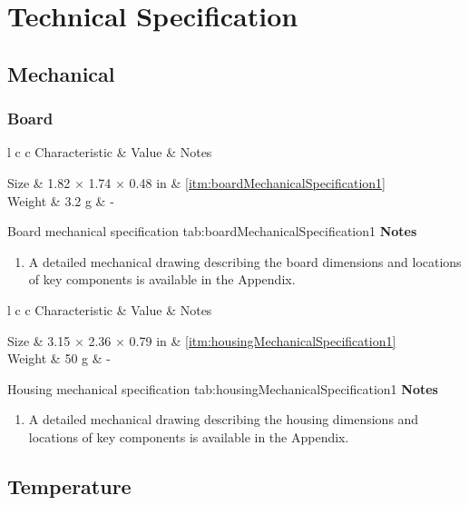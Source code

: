 \section{Technical Specification}

\newcommand{\techincalTable}[5]{
    \customTable
    {l c c}
    {#1 & Value & Notes}
    {
        #2
    }
    {#3}
    {#4}
    \textbf{Notes}
    \begin{enumerate}[nolistsep]
        #5
    \end{enumerate}
}

\newcommand{\characteristicTable}[4]{
    \techincalTable
    {Characteristic}
    {#1}
    {#2}
    {#3}
    {#4}
}

\newcommand{\conditionTable}[4]{
    \techincalTable
    {Condition}
    {#1}
    {#2}
    {#3}
    {#4}
}

\subsection{Mechanical}

\subsubsection{Board}

\newcommand{\noteMechanicalDrawings}[1]{A detailed mechanical drawing describing the #1 dimensions and locations of key components is available in the Appendix.}

\characteristicTable
{
    Size & 1.82 $\times$ 1.74 $\times$ 0.48 in & \ref{itm:boardMechanicalSpecification1}\\
    Weight & 3.2 g & -\\
}
{Board mechanical specification}
{tab:boardMechanicalSpecification1}
{
    \item \label{itm:boardMechanicalSpecification1} \noteMechanicalDrawings{board}
}

\characteristicTable
{
    Size & 3.15 $\times$ 2.36 $\times$ 0.79 in & \ref{itm:housingMechanicalSpecification1}\\
    Weight & 50 g & -\\
}
{Housing mechanical specification}
{tab:housingMechanicalSpecification1}
{
    \item \label{itm:housingMechanicalSpecification1} \noteMechanicalDrawings{housing}
}

\subsection{Temperature}
\label{sec:temperature}

